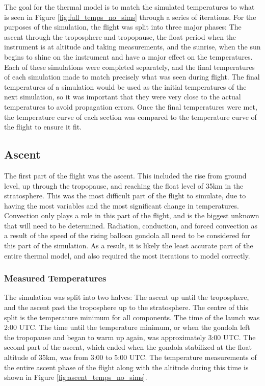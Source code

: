 The goal for the thermal model is to match the simulated temperatures to what is seen in Figure \ref{fig:full_temps_no_sims} through a series of iterations. For the purposes of the simulation, the flight was split into three major phases: The ascent through the troposphere and tropopause, the float period when the instrument is at altitude and taking measurements, and the sunrise, when the sun begins to shine on the instrument and have a major effect on the temperatures. Each of these simulations were completed separately, and the final temperatures of each simulation made to match precisely what was seen during flight. The final temperatures of a simulation would be used as the initial temperatures of the next simulation, so it was important that they were very close to the actual temperatures to avoid propagation errors. Once the final temperatures were met, the temperature curve of each section was compared to the temperature curve of the flight to ensure it fit.

\subsection{Ascent}\label{ascent}
The first part of the flight was the ascent. This included the rise from ground level, up through the tropopause, and reaching the float level of 35km in the stratosphere. This was the most difficult part of the flight to simulate, due to having the most variables and the most significant change in temperatures. Convection only plays a role in this part of the flight, and is the biggest unknown that will need to be determined. Radiation, conduction, and forced convection as a result of the speed of the rising balloon gondola all need to be considered for this part of the simulation. As a result, it is likely the least accurate part of the entire thermal model, and also required the most iterations to model correctly.

\subsubsection{Measured Temperatures}
The simulation was split into two halves: The ascent up until the troposphere, and the ascent past the troposphere up to the stratosphere. The centre of this split is the temperature minimum for all components. The time of the launch was 2:00 UTC. The time until the temperature minimum, or when the gondola left the tropopause and began to warm up again, was approximately 3:00 UTC. The second part of the ascent, which ended when the gondola stabilized at the float altitude of 35km, was from 3:00 to 5:00 UTC. The temperature measurements of the entire ascent phase of the flight along with the altitude during this time is shown in Figure \ref{fig:ascent_temps_no_sims}.


